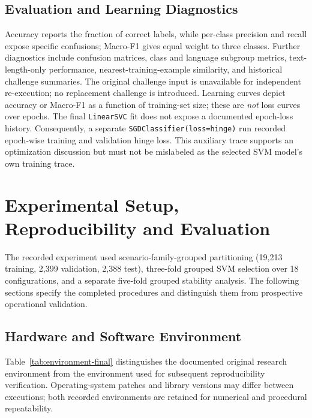 \subsection{Evaluation and Learning Diagnostics}
Accuracy reports the fraction of correct labels, while per-class precision and recall expose specific confusions; Macro-F1 gives equal weight to three classes. Further diagnostics include confusion matrices, class and language subgroup metrics, text-length-only performance, nearest-training-example similarity, and historical challenge summaries. The original challenge input is unavailable for independent re-execution; no replacement challenge is introduced. Learning curves depict accuracy or Macro-F1 as a function of training-set size; these are \emph{not} loss curves over epochs. The final \texttt{LinearSVC} fit does not expose a documented epoch-loss history. Consequently, a separate \texttt{SGDClassifier(loss=hinge)} run recorded epoch-wise training and validation hinge loss. This auxiliary trace supports an optimization discussion but must not be mislabeled as the selected SVM model's own training trace.


\section{Experimental Setup, Reproducibility and Evaluation}
\label{sec:m2}
The recorded experiment used scenario-family-grouped partitioning (19,213 training, 2,399 validation, 2,388 test), three-fold grouped SVM selection over 18 configurations, and a separate five-fold grouped stability analysis. The following sections specify the completed procedures and distinguish them from prospective operational validation.

\subsection{Hardware and Software Environment}\label{sec:environment-final}
Table~\ref{tab:environment-final} distinguishes the documented original research environment from the environment used for subsequent reproducibility verification. Operating-system patches and library versions may differ between executions; both recorded environments are retained for numerical and procedural repeatability.

